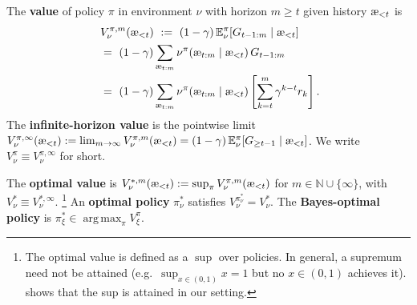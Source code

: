 \documentclass[fontsize=11pt, parskip=half]{scrartcl}
\newcommand{\Ex}{\mathbb{E}}
\DeclareMathOperator*{\argmax}{arg\,max}
\newcommand{\aes}{\textnormal{\ae}}
\begin{document}
\begin{definition}\label{def:value}
The \textbf{value} of policy $\pi$ in environment $\nu$ with horizon $m \geq t$ given history $\aes_{<t}$ is
\begin{align*}
    &V_\nu^{\pi,m}(\aes_{<t})
    ~:=~ (1-\gamma)\, \Ex_\nu^\pi\!\left[G_{t-1:m}  \mid \aes_{<t}\right] \\
    ~&=~ (1-\gamma) \sum_{\aes_{t:m}} \nu^\pi(\aes_{t:m} \mid \aes_{<t})\, G_{t-1:m} \\
    ~&=~ (1-\gamma) \sum_{\aes_{t:m}} \nu^\pi(\aes_{t:m} \mid \aes_{<t}) \left[ \sum_{k=t}^{m} \gamma^{k-t} r_k \right].
\end{align*}
The \textbf{infinite-horizon value} is the pointwise limit $V_\nu^{\pi,\infty}(\aes_{<t}) := \lim_{m \to \infty} V_\nu^{\pi,m}(\aes_{<t}) = (1-\gamma)\, \Ex_\nu^\pi[G_{\geq t-1} \mid \aes_{<t}]$.
We write $V_\nu^\pi \equiv V_\nu^{\pi,\infty}$ for short.

The \textbf{optimal value} is $V_\nu^{*,m}(\aes_{<t}) := \sup_\pi V_\nu^{\pi,m}(\aes_{<t})$ for $m \in \mathbb{N} \cup \{\infty\}$, with $V_\nu^* \equiv V_\nu^{*,\infty}$.%
\footnote{The optimal value is defined as a $\sup$ over policies.
In general, a supremum need not be attained (e.g.\ $\sup_{x \in (0,1)} x = 1$ but no $x \in (0,1)$ achieves it).
 shows that the sup is attained in our setting.}
An \textbf{optimal policy} $\pi_\nu^*$ satisfies $V_\nu^{\pi_\nu^*} = V_\nu^*$.
The \textbf{Bayes-optimal policy} is $\pi_\xi^* \in \argmax_\pi V_\xi^\pi$.
\end{definition}
\end{document}
